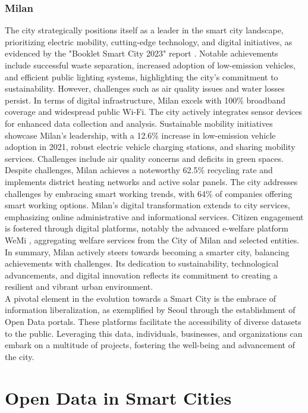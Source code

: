 \subsubsection{Milan} 
The city strategically positions itself as a leader in the smart city landscape, prioritizing electric mobility, cutting-edge technology, and digital initiatives, as evidenced by the "Booklet Smart City 2023" report \cite{SmartCity2023}. Notable achievements include successful waste separation, increased adoption of low-emission vehicles, and efficient public lighting systems, highlighting the city's commitment to sustainability. However, challenges such as air quality issues and water losses persist.
In terms of digital infrastructure, Milan excels with 100\% broadband coverage and widespread public Wi-Fi. The city actively integrates sensor devices for enhanced data collection and analysis. Sustainable mobility initiatives showcase Milan's leadership, with a 12.6\% increase in low-emission vehicle adoption in 2021, robust electric vehicle charging stations, and sharing mobility services. Challenges include air quality concerns and deficits in green spaces.
Despite challenges, Milan achieves a noteworthy 62.5\% recycling rate and implements district heating networks and active solar panels. The city addresses challenges by embracing smart working trends, with 64\% of companies offering smart working options. Milan's digital transformation extends to city services, emphasizing online administrative and informational services. Citizen engagement is fostered through digital platforms, notably the advanced e-welfare platform WeMi \cite{WeMiWebsite}, aggregating welfare services from the City of Milan and selected entities.
In summary, Milan actively steers towards becoming a smarter city, balancing achievements with challenges. Its dedication to sustainability, technological advancements, and digital innovation reflects its commitment to creating a resilient and vibrant urban environment.\\

A pivotal element in the evolution towards a Smart City is the embrace of information liberalization, as exemplified by Seoul through the establishment of Open Data portals. These platforms facilitate the accessibility of diverse datasets to the public. Leveraging this data, individuals, businesses, and organizations can embark on a multitude of projects, fostering the well-being and advancement of the city.

\section{Open Data in Smart Cities}

